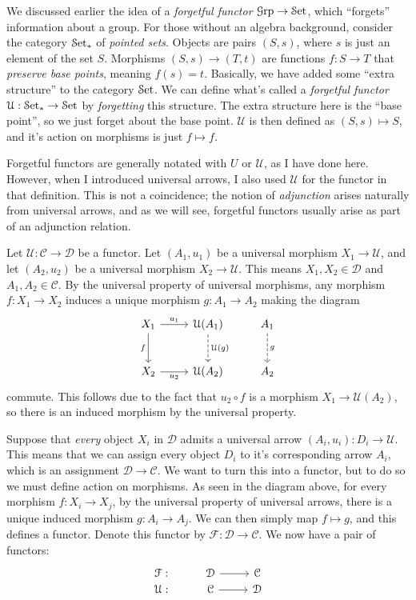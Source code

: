 We discussed earlier the idea of a \emph{forgetful functor} $\mathcal{G}\mathrm{rp} \to \mathcal{S}\mathrm{et} $, which ``forgets'' information about a group. For those without an algebra background, consider the category $\mathcal{S}\mathrm{et} _*$ of \emph{pointed sets}. Objects are pairs $(S,s)$, where $s$ is just an element of the set $S$. Morphisms $(S,s)\to (T,t)$ are functions $f : S \to T$ that \emph{preserve base points}, meaning $f(s)=t$. Basically, we have added some ``extra structure'' to the category $\mathcal{S}\mathrm{et} $. We can define what's called a \emph{forgetful functor} $\mathcal{U} : \mathcal{S}\mathrm{et} _* \to \mathcal{S}\mathrm{et} $ by \emph{forgetting} this structure. The extra structure here is the ``base point'', so we just forget about the base point. $\mathcal{U} $ is then defined as $(S,s)\mapsto S$, and it's action on morphisms is just $f\mapsto f$.

Forgetful functors are generally notated with $U$ or $\mathcal{U} $, as I have done here. However, when I introduced universal arrows, I also used $\mathcal{U} $ for the functor in that definition. This is not a coincidence; the notion of \emph{adjunction} arises naturally from universal arrows, and as we will see, forgetful functors usually arise as part of an adjunction relation.

Let $\mathcal{U} : \mathcal{C}  \to \mathcal{D} $ be a functor. Let $(A_1,u_1)$ be a universal morphism $X_1\to \mathcal{U} $, and let $(A_2,u_2)$ be a universal morphism $X_2\to \mathcal{U} $. This means $X_1,X_2\in \mathcal{D} $ and $A_1,A_2\in \mathcal{C} $. By the universal property of universal morphisms, any morphism $f : X_1 \to X_2$ induces a unique morphism $g:A_1\to A_2$ making the diagram
\[\begin{tikzcd}[row sep = 2.5em, column sep = 2.5em]
X_1\ar[" f "', d]\ar[" u_1 ", r]   & \mathcal{U} (A_1)\ar[" \mathcal{U} (g) ",dashed, d]  & A_1 \ar[" g ", dashed, d]  \\
X_2\ar[" u_2 "', r]  & \mathcal{U} (A_2) & A_2
\end{tikzcd}\]
commute. This follows due to the fact that $u_2\circ f$ is a morphism $X_1\to \mathcal{U} (A_2)$, so there is an induced morphism by the universal property.

Suppose that \emph{every} object $X_i$ in $\mathcal{D} $ admits a universal arrow $(A_i,u_i): D_i \to \mathcal{U} $. This means that we can assign every object $D_i$ to it's corresponding arrow $A_i$, which is an assignment $\mathcal{D} \to \mathcal{C} $. We want to turn this into a functor, but to do so we must define action on morphisms. As seen in the diagram above, for every morphism $f : X_i \to X_j$, by the universal property of universal arrows, there is a unique induced morphism $g : A_i \to A_j$. We can then simply map $f\mapsto g$, and this defines a functor. Denote this functor by $\mathcal{F} : \mathcal{D}  \to \mathcal{C} $. We now have a pair of functors:
\[\begin{tikzcd}[row sep = 0em, column sep = 2.5em]
	\mathcal{F} : & \mathcal{D} \ar[r] & \mathcal{C}  \\
	\mathcal{U} : & \mathcal{C}  \ar[r] & \mathcal{D} 
\end{tikzcd}\]

